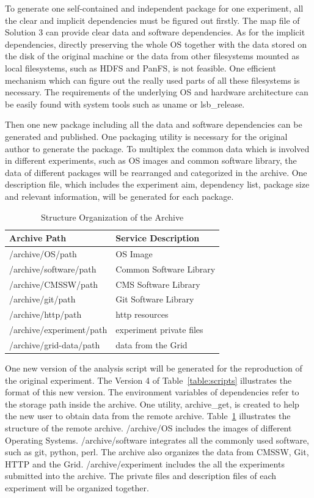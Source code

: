 \documentclass{acm_proc_article-sp}
\begin{document}
To generate one self-contained and independent package for one experiment, all
the clear and implicit dependencies must be figured out firstly. The map file
of Solution 3 can provide clear data and software dependencies. As for the
implicit dependencies, directly preserving the whole OS together with the data
stored on the disk of the original machine or the data from other filesystems
mounted as local filesystems, such as HDFS and PanFS,  is not feasible. One
efficient mechanism which can figure out the really used parts of all these
filesystems is necessary. The requirements of the underlying OS and hardware
architecture can be easily found with system tools such as uname or
lsb\_release.

Then one new package including all the data and software dependencies can be generated and published. 
One packaging utility is necessary for the original author to generate the package. 
To multiplex the common data which is involved in different experiments, such as OS images and common software library, the data of different packages will be rearranged and categorized in the archive.
One description file, which includes the experiment aim, dependency list,  package size and relevant information, will be generated for each package.

\begin{table}
    \centering
    \begin{tabular}{|l|l|}
        \hline
        Archive Path & Service Description \\ \hline
        /archive/OS/path & OS Image \\ \hline
        /archive/software/path & Common Software Library \\ \hline
        /archive/CMSSW/path & CMS Software Library \\ \hline
        /archive/git/path & Git Software Library \\ \hline
        /archive/http/path & http resources \\ \hline
        /archive/experiment/path & experiment private files \\ \hline
        /archive/grid-data/path & data from the Grid \\ \hline
    \end{tabular}
    \caption{Structure Organization of the Archive}
    \label{table:archive-map}
\end{table}

One new version of the analysis script will be generated for the reproduction
of the original experiment. The Version 4 of Table~\ref{table:scripts} illustrates the format of
this new version. The environment variables of dependencies refer to the
storage path inside the archive.  One utility, archive\_get,  is created to
help the new user to obtain data from the remote archive.
Table~\ref{table:archive-map} illustrates the structure of the remote archive.
/archive/OS includes the images of different Operating Systems.
/archive/software integrates all the commonly used software, such as git,
python, perl. The archive also organizes the data from CMSSW, Git, HTTP and the
Grid. /archive/experiment includes the all the experiments submitted into the
archive. The private files and description files of each experiment will be
organized together.
\end{document}

